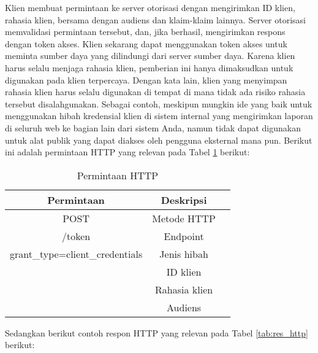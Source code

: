 Klien membuat permintaan ke server otorisasi dengan mengirimkan ID klien, rahasia klien, bersama dengan audiens dan klaim-klaim lainnya. Server otorisasi memvalidasi permintaan tersebut, dan, jika berhasil, mengirimkan respons dengan token akses. Klien sekarang dapat menggunakan token akses untuk meminta sumber daya yang dilindungi dari server sumber daya.
Karena klien harus selalu menjaga rahasia klien, pemberian ini hanya dimaksudkan untuk digunakan pada klien terpercaya. Dengan kata lain, klien yang menyimpan rahasia klien harus selalu digunakan di tempat di mana tidak ada risiko rahasia tersebut disalahgunakan. Sebagai contoh, meskipun mungkin ide yang baik untuk menggunakan hibah kredensial klien di sistem internal yang mengirimkan laporan di seluruh web ke bagian lain dari sistem Anda, namun tidak dapat digunakan untuk alat publik yang dapat diakses oleh pengguna eksternal mana pun.
Berikut ini adalah permintaan HTTP yang relevan pada Tabel \ref{tab:req_http} berikut:

\begin{table}[H]
    \caption{Permintaan HTTP}
    \vspace{0.5em}
    \centering
    \begin{tabular}{|c|c|c|}
        \hline
        Permintaan & Deskripsi \\
        \hline \hline
        POST & Metode HTTP \\
        \hline
        /token & Endpoint \\
        \hline
        grant\_type=client\_credentials & Jenis hibah \\
        \hline
        & ID klien \\
        \hline
        & Rahasia klien \\
        \hline
        & Audiens \\
        \hline
    \end{tabular}
    \label{tab:req_http}
\end{table}

Sedangkan berikut contoh respon HTTP yang relevan pada Tabel \ref{tab:res_http} berikut:

